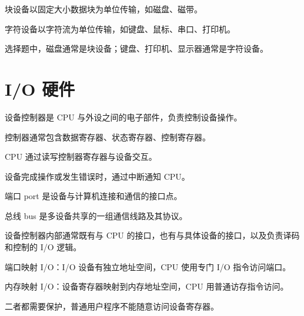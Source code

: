 \begin{points}
  \item 块设备以固定大小数据块为单位传输，如磁盘、磁带。
  \item 字符设备以字符流为单位传输，如键盘、鼠标、串口、打印机。
  \item 选择题中，磁盘通常是块设备；键盘、打印机、显示器通常是字符设备。
\end{points}


\section{I/O 硬件}
\begin{points}
  \item 设备控制器是 CPU 与外设之间的电子部件，负责控制设备操作。
  \item 控制器通常包含数据寄存器、状态寄存器、控制寄存器。
  \item CPU 通过读写控制器寄存器与设备交互。
  \item 设备完成操作或发生错误时，通过中断通知 CPU。
\end{points}


\begin{points}
  \item 端口 port 是设备与计算机连接和通信的接口点。
  \item 总线 bus 是多设备共享的一组通信线路及其协议。
  \item 设备控制器内部通常既有与 CPU 的接口，也有与具体设备的接口，以及负责译码和控制的 I/O 逻辑。
\end{points}


\begin{points}
  \item 端口映射 I/O：I/O 设备有独立地址空间，CPU 使用专门 I/O 指令访问端口。
  \item 内存映射 I/O：设备寄存器映射到内存地址空间，CPU 用普通访存指令访问。
  \item 二者都需要保护，普通用户程序不能随意访问设备寄存器。
\end{points}


